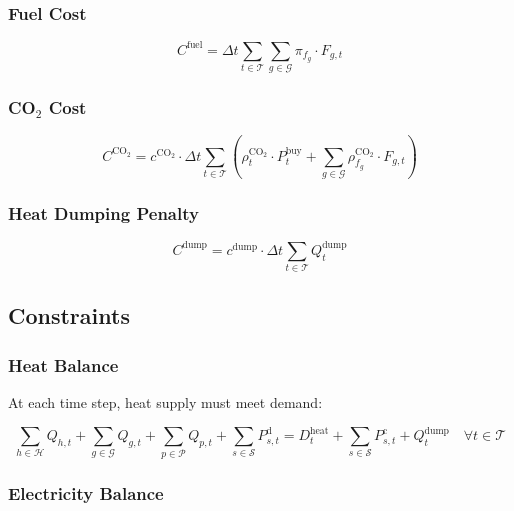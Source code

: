 \documentclass[11pt]{article}
\begin{document}
\subsubsection{Fuel Cost}

\begin{equation}
C^{\text{fuel}} = \Delta t \sum_{t \in \mathcal{T}} \sum_{g \in \mathcal{G}} \pi_{f_g} \cdot F_{g,t}
\label{eq:cost_fuel}
\end{equation}

\subsubsection{CO$_2$ Cost}

\begin{equation}
C^{\text{CO}_2} = c^{\text{CO}_2} \cdot \Delta t \sum_{t \in \mathcal{T}} \left( \rho_t^{\text{CO}_2} \cdot P_t^{\text{buy}} + \sum_{g \in \mathcal{G}} \rho_{f_g}^{\text{CO}_2} \cdot F_{g,t} \right)
\label{eq:cost_co2}
\end{equation}

\subsubsection{Heat Dumping Penalty}

\begin{equation}
C^{\text{dump}} = c^{\text{dump}} \cdot \Delta t \sum_{t \in \mathcal{T}} Q_t^{\text{dump}}
\label{eq:cost_dump}
\end{equation}

\subsection{Constraints}

\subsubsection{Heat Balance}

At each time step, heat supply must meet demand:

\begin{equation}
\sum_{h \in \mathcal{H}} Q_{h,t} + \sum_{g \in \mathcal{G}} Q_{g,t} + \sum_{p \in \mathcal{P}} Q_{p,t} + \sum_{s \in \mathcal{S}} P_{s,t}^{\text{d}} = D_t^{\text{heat}} + \sum_{s \in \mathcal{S}} P_{s,t}^{\text{c}} + Q_t^{\text{dump}} \quad \forall t \in \mathcal{T}
\label{eq:heat_balance}
\end{equation}

\subsubsection{Electricity Balance}
\end{document}

